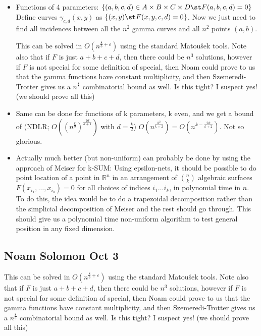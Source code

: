 \begin{itemize}
\item Functions of 4 parameters:
$\{(a,b,c,d) \in A\times B\times C\times D \st F(a,b,c,d)=0\}$
Define curves $\gamma_{c,d}(x,y)$ as
$\{(x,y) \st F(x,y,c,d)=0\}$. Now we just need to find all incidences
between all the $n^2$ gamma curves and all $n^2$ points $(a,b)$.

This can be solved in $O(n^{\frac{8}{3}+\varepsilon})$ using the standard Matou\v{s}ek tools.
Note also that if $F$ is just $a+b+c+d$, then there could be $n^3$ solutions,
however if $F$ is not special for some definition of special, then
Noam could prove to us that the gamma functions have constant
multiplicity, and then Szemeredi-Trotter gives us a $n^{\frac{8}{3}}$ combinatorial
bound as well. Is this tight? I suspect yes! (we should prove all this)

\item Same can be done for functions of k parameters, k even, and we get
a bound of
(NDLR; $O({(n^\frac{k}{2})}^\frac{2d}{d+1})$ with $d=\frac{k}{2}$)
$O(n^{\frac{k^2}{k + 2}}) = O(n^{k - \frac{2k}{k+2}})$. Not so glorious.

\item Actually much better (but non-uniform) can probably be done by using
the approach of Meiser for k-SUM: Using epsilon-nets, it should be
possible to do point location of a point in $\mathbb{R}^n$ in an arrangement of
$\binom{n}{k}$ algebraic surfaces $F(x_{i_1},\ldots,x_{i_k})=0$ for all choices of
indices $i_1 \ldots i_k$, in polynomial time in $n$. To do this, the idea would be
to do a trapezoidal decomposition rather than the simplicial
decomposition of Meiser and the rest should go through. This should
give us a polynomial time non-uniform algorithm to test general
position in any fixed dimension.
\end{itemize}

\subsection{Noam Solomon Oct 3}

\begin{displayquote}
This can be solved in $O(n^{\frac{8}{3}+\varepsilon})$ using the standard Matou\v{s}ek tools.
Note also that if $F$ is just $a+b+c+d$, then there could be $n^3$ solutions,
however if $F$ is not special for some definition of special, then
Noam could prove to us that the gamma functions have constant
multiplicity, and then Szemeredi-Trotter gives us a $n^{\frac{8}{3}}$ combinatorial
bound as well. Is this tight? I suspect yes! (we should prove all this)
\end{displayquote}

